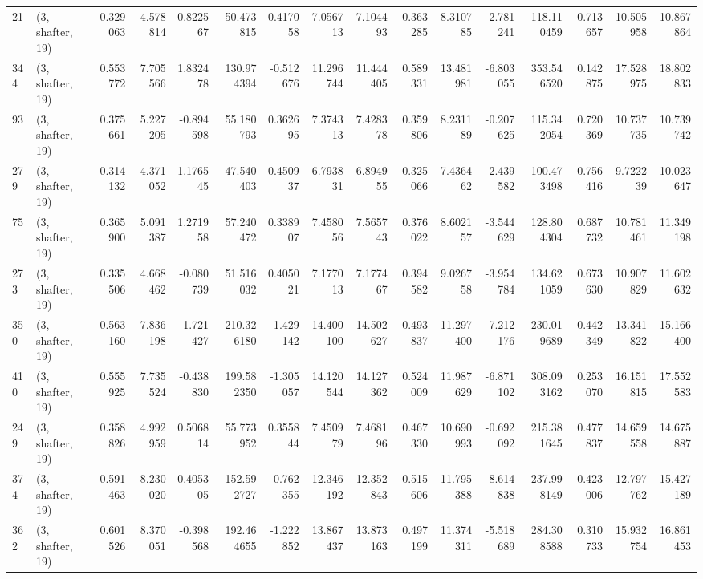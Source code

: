 \begin{tabular}{llrrrrrrrrrrrrrr}
21  &  (3, shafter, 19) &   0.329063 &   4.578814 &   0.822567 &    50.473815 &   0.417058 &   7.056713 &   7.104493 &  0.363285 &   8.310785 &  -2.781241 &   118.110459 &   0.713657 &  10.505958 &  10.867864 \\
344 &  (3, shafter, 19) &   0.553772 &   7.705566 &   1.832478 &   130.974394 &  -0.512676 &  11.296744 &  11.444405 &  0.589331 &  13.481981 &  -6.803055 &   353.546520 &   0.142875 &  17.528975 &  18.802833 \\
93  &  (3, shafter, 19) &   0.375661 &   5.227205 &  -0.894598 &    55.180793 &   0.362695 &   7.374313 &   7.428378 &  0.359806 &   8.231189 &  -0.207625 &   115.342054 &   0.720369 &  10.737735 &  10.739742 \\
279 &  (3, shafter, 19) &   0.314132 &   4.371052 &   1.176545 &    47.540403 &   0.450937 &   6.793831 &   6.894955 &  0.325066 &   7.436462 &  -2.439582 &   100.473498 &   0.756416 &   9.722239 &  10.023647 \\
75  &  (3, shafter, 19) &   0.365900 &   5.091387 &   1.271958 &    57.240472 &   0.338907 &   7.458056 &   7.565743 &  0.376022 &   8.602157 &  -3.544629 &   128.804304 &   0.687732 &  10.781461 &  11.349198 \\
273 &  (3, shafter, 19) &   0.335506 &   4.668462 &  -0.080739 &    51.516032 &   0.405021 &   7.177013 &   7.177467 &  0.394582 &   9.026758 &  -3.954784 &   134.621059 &   0.673630 &  10.907829 &  11.602632 \\
350 &  (3, shafter, 19) &   0.563160 &   7.836198 &  -1.721427 &   210.326180 &  -1.429142 &  14.400100 &  14.502627 &  0.493837 &  11.297400 &  -7.212176 &   230.019689 &   0.442349 &  13.341822 &  15.166400 \\
410 &  (3, shafter, 19) &   0.555925 &   7.735524 &  -0.438830 &   199.582350 &  -1.305057 &  14.120544 &  14.127362 &  0.524009 &  11.987629 &  -6.871102 &   308.093162 &   0.253070 &  16.151815 &  17.552583 \\
249 &  (3, shafter, 19) &   0.358826 &   4.992959 &   0.506814 &    55.773952 &   0.355844 &   7.450979 &   7.468196 &  0.467330 &  10.690993 &  -0.692092 &   215.381645 &   0.477837 &  14.659558 &  14.675887 \\
374 &  (3, shafter, 19) &   0.591463 &   8.230020 &   0.405305 &   152.592727 &  -0.762355 &  12.346192 &  12.352843 &  0.515606 &  11.795388 &  -8.614838 &   237.998149 &   0.423006 &  12.797762 &  15.427189 \\
362 &  (3, shafter, 19) &   0.601526 &   8.370051 &  -0.398568 &   192.464655 &  -1.222852 &  13.867437 &  13.873163 &  0.497199 &  11.374311 &  -5.518689 &   284.308588 &   0.310733 &  15.932754 &  16.861453 \\

\end{tabular}
